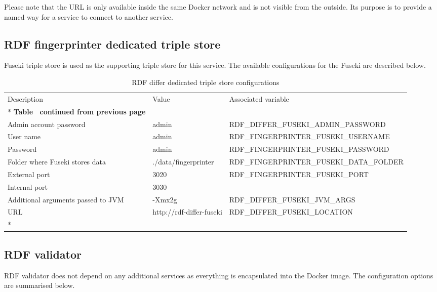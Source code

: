 	Please note that the URL is only available inside the same Docker network and is not visible from the outside. Its purpose is to provide a named way for a service to connect to another service.
	
	\subsection{RDF fingerprinter dedicated triple store}
	
	Fuseki triple store is used as the supporting triple store for this service.
	The available configurations for the Fuseki are described below. 
	
	\begin{longtable}[c]{@{}p{4cm}p{2cm}l@{}}
		\toprule
		Description & Value & Associated variable \\* \midrule
		\endfirsthead
		\multicolumn{3}{c}%
		{{\bfseries Table \thetable\ continued from previous page}} \\
		\endhead
		\bottomrule
		\endfoot
		\endlastfoot
		Admin account password & admin & RDF\_DIFFER\_FUSEKI\_ADMIN\_PASSWORD \\
		User name & admin & RDF\_FINGERPRINTER\_FUSEKI\_USERNAME \\
		Password & admin & RDF\_FINGERPRINTER\_FUSEKI\_PASSWORD \\
		Folder where Fuseki stores data & ./data/fingerprinter & RDF\_FINGERPRINTER\_FUSEKI\_DATA\_FOLDER \\
		External port & 3020 & RDF\_FINGERPRINTER\_FUSEKI\_PORT \\
		Internal port & 3030 &  \\
		Additional arguments passed to JVM & -Xmx2g & RDF\_DIFFER\_FUSEKI\_JVM\_ARGS \\
		URL & http://rdf-differ-fuseki & RDF\_DIFFER\_FUSEKI\_LOCATION \\* \bottomrule
		\caption{RDF differ dedicated triple store configurations}
		\label{tab:my-table8}\\
	\end{longtable}
	
	\subsection{RDF validator}
	
	RDF validator does not depend on any additional services as everything is encapsulated into the Docker image. The configuration options are summarised below. 
	
